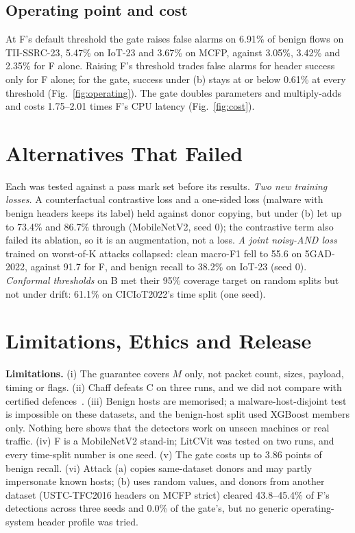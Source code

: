 \documentclass[journal]{IEEEtran}
\begin{document}
\subsection{Operating point and cost}
\label{sec:cost}

At F's default threshold the gate raises false alarms on 6.91\% of benign flows on TII-SSRC-23, 5.47\% on IoT-23 and 3.67\% on MCFP, against 3.05\%, 3.42\% and 2.35\% for F alone. Raising F's threshold trades false alarms for header success only for F alone; for the gate, success under (b) stays at or below 0.61\% at every threshold (Fig.~\ref{fig:operating}). The gate doubles parameters and multiply-adds and costs 1.75--2.01 times F's CPU latency (Fig.~\ref{fig:cost}).

\section{Alternatives That Failed}
\label{sec:failed}

Each was tested against a pass mark set before its results.
\emph{Two new training losses.} A counterfactual contrastive loss and a one-sided loss (malware with benign headers keeps its label) held against donor copying, but under (b) let up to 73.4\% and 86.7\% through (MobileNetV2, seed 0); the contrastive term also failed its ablation, so it is an augmentation, not a loss.
\emph{A joint noisy-AND loss} trained on worst-of-K attacks collapsed: clean macro-F1 fell to 55.6 on 5GAD-2022, against 91.7 for F, and benign recall to 38.2\% on IoT-23 (seed 0).
\emph{Conformal thresholds} on B met their 95\% coverage target on random splits but not under drift: 61.1\% on CICIoT2022's time split (one seed).

\section{Limitations, Ethics and Release}
\label{sec:discussion}

\textbf{Limitations.} (i) The guarantee covers $M$ only, not packet count, sizes, payload, timing or flags. (ii) Chaff defeats C on three runs, and we did not compare with certified defences~\cite{yan2025certta}. (iii) Benign hosts are memorised; a malware-host-disjoint test is impossible on these datasets, and the benign-host split used XGBoost members only. Nothing here shows that the detectors work on unseen machines or real traffic. (iv) F is a MobileNetV2 stand-in; LitCVit was tested on two runs, and every time-split number is one seed. (v) The gate costs up to 3.86 points of benign recall. (vi) Attack (a) copies same-dataset donors and may partly impersonate known hosts; (b) uses random values, and donors from another dataset (USTC-TFC2016 headers on MCFP strict) cleared 43.8--45.4\% of F's detections across three seeds and 0.0\% of the gate's, but no generic operating-system header profile was tried.
\end{document}
